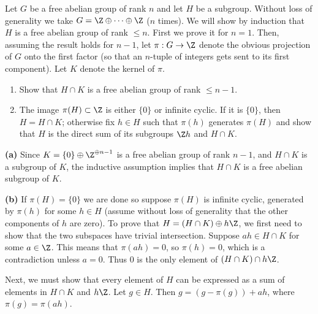 \documentclass[11pt,letterpaper]{article}
\begin{document}
\begin{cproblem}{2.24}
    Let $G$ be a free abelian group of rank $n$ and let $H$ be a subgroup. Without loss of generality we take $G=\Z\oplus \cdots \oplus \Z$ ($n$ times). We will show by induction that $H$ is a free abelian group of rank $\leq n$. First we prove it for $n=1$. Then, assuming the result holds for $n-1$, let $\pi : G \to \Z$ denote the obvious projection of $G$ onto the first factor (so that an $n$-tuple of integers gets sent to its first component). Let $K$ denote the kernel of $\pi$.  
    \begin{enumerate}
        \item Show that $H\cap K$ is a free abelian group of rank $\leq n-1$.
        \item The image $\pi(H)\subset \Z$ is either $\{0\}$ or infinite cyclic. If it is $\{0\}$, then $H=H\cap K$; otherwise fix $h\in H$ such that $\pi(h)$ generates $\pi(H)$ and show that $H$ is the direct sum of its subgroups $\Z h$ and $H\cap K$.
    \end{enumerate}
\end{cproblem}

\begin{solution}
    \textbf{(a)} Since $K=\{0\}\oplus \Z^{\oplus n-1}$ is a free abelian group of rank $n-1$, and $H\cap K$ is a subgroup of $K$, the inductive assumption implies that $H\cap K$ is a free abelian subgroup of $K$.
    
    \textbf{(b)} If $\pi(H)=\{0\}$ we are done so suppose $\pi(H)$ is infinite cyclic, generated by $\pi(h)$ for some $h\in H$ (assume without loss of generality that the other components of $h$ are zero). To prove that $H=(H\cap K)\oplus h\Z$, we first need to show that the two subspaces have trivial intersection. Suppose $ah\in H\cap K$ for some $a\in \Z$. This means that $\pi(ah)=0$, so $\pi(h)=0$, which is a contradiction unless $a=0$. Thus $0$ is the only element of $(H\cap K)\cap h\Z$. 
    
    Next, we must show that every element of $H$ can be expressed as a sum of elements in $H\cap K$ and $h\Z$. Let $g\in H$. Then $g=(g-\pi(g))+ah$, where $\pi(g)=\pi(ah)$.   
\end{solution}
\end{document}
